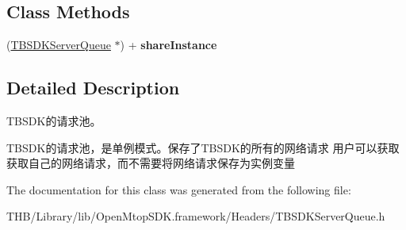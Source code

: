 \subsection*{Class Methods}
\begin{DoxyCompactItemize}
\item 
\mbox{\label{interface_t_b_s_d_k_server_queue_a46810cd71718a2bf1d7119e1eb3f6f7b}} 
(\mbox{\hyperlink{interface_t_b_s_d_k_server_queue}{T\+B\+S\+D\+K\+Server\+Queue}} $\ast$) + {\bfseries share\+Instance}
\end{DoxyCompactItemize}


\subsection{Detailed Description}
T\+B\+S\+D\+K的请求池。

T\+B\+S\+D\+K的请求池，是单例模式。保存了\+T\+B\+S\+D\+K的所有的网络请求 用户可以获取获取自己的网络请求，而不需要将网络请求保存为实例变量 

The documentation for this class was generated from the following file\+:\begin{DoxyCompactItemize}
\item 
T\+H\+B/\+Library/lib/\+Open\+Mtop\+S\+D\+K.\+framework/\+Headers/T\+B\+S\+D\+K\+Server\+Queue.\+h\end{DoxyCompactItemize}
